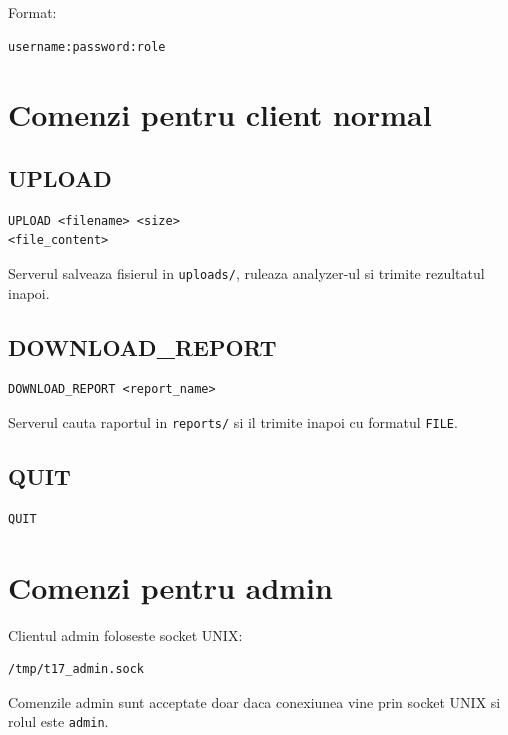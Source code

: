 \documentclass[12pt,a4paper]{article}
\begin{document}
Format:

\begin{lstlisting}[style=code]
username:password:role
\end{lstlisting}

\section{Comenzi pentru client normal}

\subsection{UPLOAD}

\begin{lstlisting}[style=code]
UPLOAD <filename> <size>
<file_content>
\end{lstlisting}

Serverul salveaza fisierul in \texttt{uploads/}, ruleaza analyzer-ul si trimite rezultatul inapoi.

\subsection{DOWNLOAD\_REPORT}

\begin{lstlisting}[style=code]
DOWNLOAD_REPORT <report_name>
\end{lstlisting}

Serverul cauta raportul in \texttt{reports/} si il trimite inapoi cu formatul \texttt{FILE}.

\subsection{QUIT}

\begin{lstlisting}[style=code]
QUIT
\end{lstlisting}

\section{Comenzi pentru admin}

Clientul admin foloseste socket UNIX:

\begin{lstlisting}[style=code]
/tmp/t17_admin.sock
\end{lstlisting}

Comenzile admin sunt acceptate doar daca conexiunea vine prin socket UNIX si rolul este \texttt{admin}.
\end{document}
